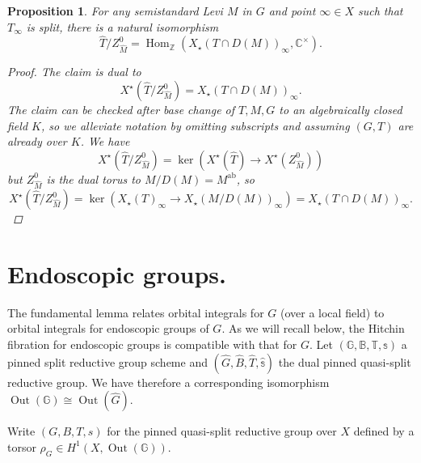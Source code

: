 \documentclass[openany]{amsbook}
\newtheorem{proposition}[theorem]{Proposition}
\theoremstyle{definition}
\theoremstyle{remark}
\numberwithin{equation}{section}
\newcommand{\Z}{\mathbb{Z}}
\newcommand{\C}{\mathbb{C}}
\newcommand{\G}{\mathbb{G}}
\newcommand{\B}{\mathbb{B}}
\newcommand{\T}{\mathbb{T}}
\renewcommand{\-}{\operatorname{-}}
\newcommand{\Hom}{\operatorname{Hom}}
\newcommand{\Out}{\operatorname{Out}}
\newcommand{\ab}{\mathrm{ab}}
\begin{document}
\begin{proposition}\label{prop.dual.levi.chars}
    For any semistandard Levi $M$ in $G$ and point $\infty \in X$ such that $T_\infty$ is split, there is a natural isomorphism
    $$
        \widehat{T}/Z_{\widehat{M}}^0 = \Hom_{\Z}(X_{\star}(T\cap D(M))_\infty, \C^\times).
    $$
    \begin{proof}
        The claim is dual to 
        $$
            X^\star(\widehat{T}/Z^0_{\widehat{M}}) = X_\star(T \cap D(M))_\infty.
        $$
        The claim can be checked after base change of $T,M,G$ to an algebraically closed field $K$, so we alleviate notation by omitting subscripts and assuming $(G,T)$ are already over $K$. We have
        $$X^\star(\widehat{T}/Z_{\widehat{M}}^0) = \ker(X^\star(\widehat{T}) \to X^\star(Z_{\widehat{M}}^0))$$
        but $Z^0_{\widehat{M}}$ is the dual torus to $M/D(M)= M^{\ab}$, so 
        $$
        X^\star(\widehat{T}/Z_{\widehat{M}}^0) = \ker(X_\star(T)_\infty \to X_\star(M/D(M))_\infty) = X_\star(T \cap D(M))_\infty.
        $$
    \end{proof}
\end{proposition}

\section{Endoscopic groups.}

The fundamental lemma relates orbital integrals for $G$ (over a local field) to orbital integrals for endoscopic groups of $G$. As we will recall below, the Hitchin fibration for endoscopic groups is compatible with that for $G$. Let $(\G, \B, \T, \mathbb{s})$ a pinned split reductive group scheme and $(\widehat{G}, \widehat{B}, \widehat{T}, \widehat{\mathbb{s}})$ the dual pinned quasi-split reductive group. We have therefore a corresponding isomorphism $\Out(\G) \cong \Out(\widehat{G})$.

Write $(G, B, T, s)$ for the pinned quasi-split reductive group over $X$ defined by a torsor $\rho_G \in H^1(X, \Out(\G))$.
\end{document}
